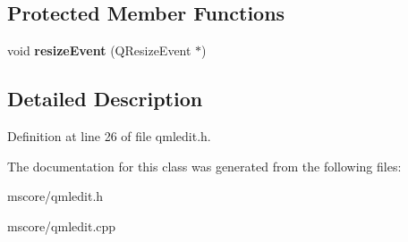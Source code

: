 \subsection*{Protected Member Functions}
\begin{DoxyCompactItemize}
\item 
\mbox{\label{class_ms_1_1_qml_edit_a334705a1c7ca63d50092a8765505ed3d}} 
void {\bfseries resize\+Event} (Q\+Resize\+Event $\ast$)
\end{DoxyCompactItemize}


\subsection{Detailed Description}


Definition at line 26 of file qmledit.\+h.



The documentation for this class was generated from the following files\+:\begin{DoxyCompactItemize}
\item 
mscore/qmledit.\+h\item 
mscore/qmledit.\+cpp\end{DoxyCompactItemize}
